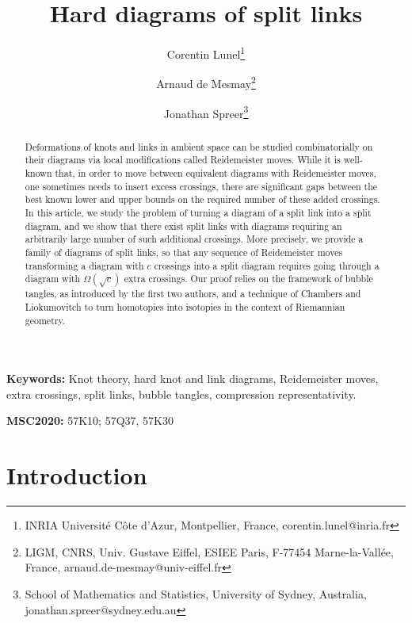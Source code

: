 \documentclass{article}
\title{Hard diagrams of split links}
\author{Corentin Lunel\thanks{INRIA Université Côte d'Azur, Montpellier, France, corentin.lunel@inria.fr} \and Arnaud de Mesmay\thanks{LIGM, CNRS, Univ. Gustave Eiffel, ESIEE Paris, F-77454 Marne-la-Vall\'ee, France, arnaud.de-mesmay@univ-eiffel.fr} \and Jonathan Spreer\thanks{School of Mathematics and Statistics, University of Sydney, Australia, jonathan.spreer@sydney.edu.au}}
\date{}
\begin{document}
\maketitle

\begin{abstract}
Deformations of knots and links in ambient space can be studied combinatorially on their diagrams via local modifications called Reidemeister moves. While it is well-known that, in order to move between equivalent diagrams with Reidemeister moves, one sometimes needs to insert excess crossings, there are significant gaps between the best known lower and upper bounds on the required number of these added crossings. In this article, we study the problem of turning a diagram of a split link into a split diagram, and we show that there exist split links with diagrams requiring an arbitrarily large number of such additional crossings. More precisely, we provide a family of diagrams of split links, so that any sequence of Reidemeister moves transforming a diagram with $c$ crossings into a split diagram requires going through a diagram with $\Omega(\sqrt{c})$ extra crossings. Our proof relies on the framework of bubble tangles, as introduced by the first two authors, and a technique of Chambers and Liokumovitch to turn homotopies into isotopies in the context of Riemannian geometry.
\end{abstract}

\noindent
{\bf Keywords:} Knot theory, hard knot and link diagrams, Reidemeister moves, extra crossings, split links, bubble tangles, compression representativity.

\smallskip

\noindent
{\bf MSC2020:} 57K10; %
57Q37, %
57K30  %



\section{Introduction}\label{sec_intro}
\end{document}
